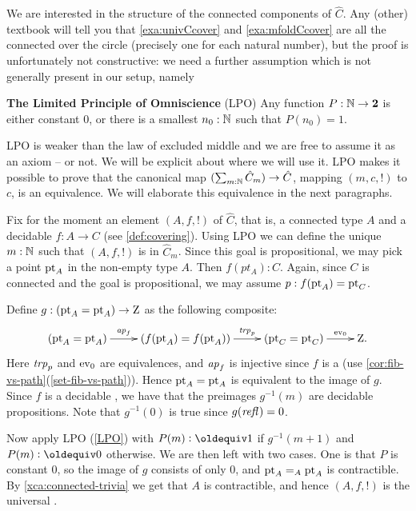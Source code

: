 We are interested in the structure of the connected components of $\hat C$. 
Any (other) textbook will tell you that \cref{exa:univCcover} and \cref{exa:mfoldCcover}
are all the connected \coverings over 
the circle (precisely one for each natural number), but the proof is unfortunately not constructive: 
we need a further assumption which is not generally present in our setup, namely

\begin{principle}
  \label{LPO}
  {\bf The Limited Principle of Omniscience} (LPO)
  Any function $P:\mathbb{N}\to\mathbf{2}$ is either constant $0$,
  or there is a smallest $n_0:\mathbb{N}$ such that $P(n_0)=1$.
\end{principle}

LPO is weaker than the law of excluded middle and we are free to assume it as an axiom -- or not.
We will be explicit about where we will use it.
LPO makes it possible to prove that the canonical map $(\sum_{m:\mathbb{N}} \hat C_m) \to \hat C$,
mapping $(m,c,!)$ to $c$, is an equivalence.
We will elaborate this equivalence in the next paragraphs.

Fix for the moment an element $(A,f,!)$ of $\hat C$, that is,
a connected type $A$ and a decidable \covering  $f:A\to C$ (see \cref{def:covering}).
Using LPO we can define the unique $m:\mathbb{N}$ such that $(A,f,!)$ is in $\hat C_m$.
Since this goal is propositional, we may pick a point ${\mathord{\mathrm{pt}}}_A$ in 
the non-empty type $A$. Then $f(pt_A) : C$. Again, since $C$ is connected
and the goal is propositional, we may assume $p: f({\mathord{\mathrm{pt}}}_A) = {\mathord{\mathrm{pt}}}_C$.

Define $g: ({\mathord{\mathrm{pt}}}_A={\mathord{\mathrm{pt}}}_A)\to\mathrm{Z}$ as the following composite:
\[
\xymatrix{
(\pt_A=\pt_A)\ar[r]^-{\ap{f}}&
(f(\pt_A)=f(\pt_A))\ar[r]^-{\trp{p}}&
(\pt_C=\pt_C)\ar[r]^-{\ev_0}&
\zet.}
\]
Here $\mathop{\mathit{trp}_{p}}$ and $\mathrm{ev}_0$ are equivalences, and $\mathop{{\it ap}_{f}}$ is injective
since $f$ is a \covering (use \cref{cor:fib-vs-path}(\ref{set-fib-vs-path})).
Hence ${\mathord{\mathrm{pt}}}_A={\mathord{\mathrm{pt}}}_A$ is equivalent to the image of $g$.
Since $f$ is a decidable \covering, we have that the preimages $g^{-1}(m)$
are decidable propositions. Note that $g^{-1}(0)$ is true since $g(\mathop{{\it refl}_{}})=0$.

Now apply LPO (\cref{LPO}) with $P(m)\defeq 1$ if $g^{-1}(m+1)$ and $P(m)\defeq 0$ otherwise.
We are then left with two cases.
One is that $P$ is constant $0$, so the image of $g$ consists of only $0$, 
and ${\mathord{\mathrm{pt}}}_A=_A{\mathord{\mathrm{pt}}}_A$ is contractible. By \cref{xca:connected-trivia}
we get that $A$ is contractible, and hence $(A,f,!)$ is the universal \covering.

